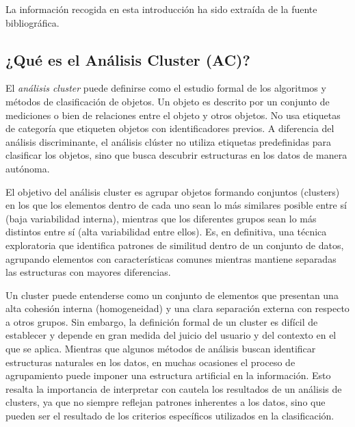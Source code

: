 La información recogida en esta introducción ha sido extraída de la fuente bibliográfica\cite{clustering-2}. %

\subsection{¿Qué es el Análisis Cluster (AC)?}

El \textit{análisis cluster} puede definirse como el estudio formal de los algoritmos y métodos de clasificación de objetos. Un objeto es descrito por un conjunto de mediciones o
bien de relaciones entre el objeto y otros objetos. No usa etiquetas de categoría que etiqueten objetos con identificadores previos. A diferencia del análisis discriminante, el 
análisis clúster no utiliza etiquetas predefinidas para clasificar los objetos, sino que busca descubrir estructuras en los datos de manera autónoma. \newline

El objetivo del análisis cluster es agrupar objetos formando conjuntos (clusters) en los que los elementos dentro de cada uno sean lo más similares posible entre sí (baja 
variabilidad interna), mientras que los diferentes grupos sean lo más distintos entre sí (alta variabilidad entre ellos). Es, en definitiva, una técnica exploratoria que 
identifica patrones de similitud dentro de un conjunto de datos, agrupando elementos con características comunes mientras mantiene separadas 
las estructuras con mayores diferencias\cite{bejar-AC}.\newline %

Un cluster puede entenderse como un conjunto de elementos que presentan una alta cohesión interna (homogeneidad) y una clara separación externa con respecto a otros grupos. 
Sin embargo, la definición formal de un cluster es difícil de establecer y depende en gran medida del juicio del usuario y del contexto en el que se aplica. Mientras que 
algunos métodos de análisis buscan identificar estructuras naturales en los datos, en muchas ocasiones el proceso de agrupamiento puede imponer una estructura artificial 
en la información. Esto resalta la importancia de interpretar con cautela los resultados de un análisis de clusters, ya que no siempre reflejan patrones inherentes a los 
datos, sino que pueden ser el resultado de los criterios específicos utilizados en la clasificación\cite{clustering-2}. \newline %

